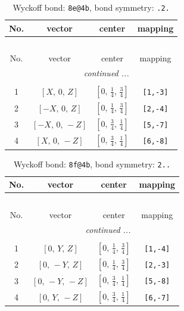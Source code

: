 \documentclass[fleqn,8pt]{jsarticle}
\begin{document}
\renewcommand{\arraystretch}{1.2}
\begin{longtable}{cccc}
\caption{Wyckoff bond: {\tt 8e@4b}, bond symmetry: {\tt .2.}}
 \\
 \hline \hline
No. & vector & center & mapping \\ \hline \endfirsthead

\multicolumn{3}{l}{\tablename\ \thetable{}} \\
 \hline \hline
No. & vector & center & mapping \\ \hline \endhead

 \hline \hline
\multicolumn{3}{r}{\footnotesize\it continued ...} \\ \endfoot

 \hline \hline
\multicolumn{3}{r}{} \\ \endlastfoot

1 & $\left[ X,\, 0,\, Z \right]$ & $\left[ 0,\, \frac{1}{4},\, \frac{3}{4} \right]$ & {\tt [1,-3]} \\ \hline
2 & $\left[ - X,\, 0,\, Z \right]$ & $\left[ 0,\, \frac{1}{4},\, \frac{3}{4} \right]$ & {\tt [2,-4]} \\ \hline
3 & $\left[ - X,\, 0,\, - Z \right]$ & $\left[ 0,\, \frac{3}{4},\, \frac{1}{4} \right]$ & {\tt [5,-7]} \\ \hline
4 & $\left[ X,\, 0,\, - Z \right]$ & $\left[ 0,\, \frac{3}{4},\, \frac{1}{4} \right]$ & {\tt [6,-8]} \\
\end{longtable}
\renewcommand{\arraystretch}{1.2}
\begin{longtable}{cccc}
\caption{Wyckoff bond: {\tt 8f@4b}, bond symmetry: {\tt 2..}}
 \\
 \hline \hline
No. & vector & center & mapping \\ \hline \endfirsthead

\multicolumn{3}{l}{\tablename\ \thetable{}} \\
 \hline \hline
No. & vector & center & mapping \\ \hline \endhead

 \hline \hline
\multicolumn{3}{r}{\footnotesize\it continued ...} \\ \endfoot

 \hline \hline
\multicolumn{3}{r}{} \\ \endlastfoot

1 & $\left[ 0,\, Y,\, Z \right]$ & $\left[ 0,\, \frac{1}{4},\, \frac{3}{4} \right]$ & {\tt [1,-4]} \\ \hline
2 & $\left[ 0,\, - Y,\, Z \right]$ & $\left[ 0,\, \frac{1}{4},\, \frac{3}{4} \right]$ & {\tt [2,-3]} \\ \hline
3 & $\left[ 0,\, - Y,\, - Z \right]$ & $\left[ 0,\, \frac{3}{4},\, \frac{1}{4} \right]$ & {\tt [5,-8]} \\ \hline
4 & $\left[ 0,\, Y,\, - Z \right]$ & $\left[ 0,\, \frac{3}{4},\, \frac{1}{4} \right]$ & {\tt [6,-7]} \\
\end{longtable}
\end{document}
